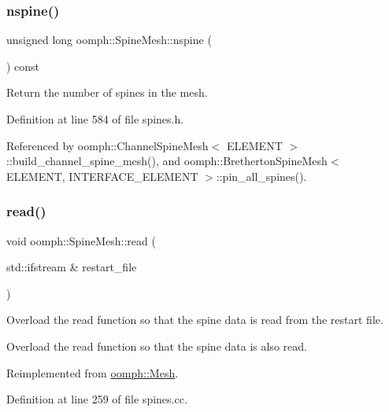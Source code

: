\subsubsection{\texorpdfstring{nspine()}{nspine()}}
{\footnotesize\ttfamily unsigned long oomph\+::\+Spine\+Mesh\+::nspine (\begin{DoxyParamCaption}{ }\end{DoxyParamCaption}) const\hspace{0.3cm}{\ttfamily [inline]}}



Return the number of spines in the mesh. 



Definition at line 584 of file spines.\+h.



Referenced by oomph\+::\+Channel\+Spine\+Mesh$<$ E\+L\+E\+M\+E\+N\+T $>$\+::build\+\_\+channel\+\_\+spine\+\_\+mesh(), and oomph\+::\+Bretherton\+Spine\+Mesh$<$ E\+L\+E\+M\+E\+N\+T, I\+N\+T\+E\+R\+F\+A\+C\+E\+\_\+\+E\+L\+E\+M\+E\+N\+T $>$\+::pin\+\_\+all\+\_\+spines().

\mbox{\label{classoomph_1_1SpineMesh_a281b1de21b0957de28fe78a93c80a215}} 
\subsubsection{\texorpdfstring{read()}{read()}}
{\footnotesize\ttfamily void oomph\+::\+Spine\+Mesh\+::read (\begin{DoxyParamCaption}\item[{std\+::ifstream \&}]{restart\+\_\+file }\end{DoxyParamCaption})\hspace{0.3cm}{\ttfamily [virtual]}}



Overload the read function so that the spine data is read from the restart file. 

Overload the read function so that the spine data is also read. 

Reimplemented from \hyperlink{classoomph_1_1Mesh_ac192b41d1a24297ff38854548defd92b}{oomph\+::\+Mesh}.



Definition at line 259 of file spines.\+cc.



